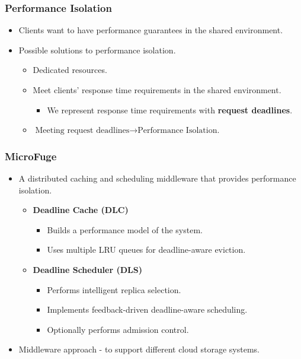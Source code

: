 \documentclass{beamer}
\newcommand{\myv}{\vspace{3 mm}}
\begin{document}
\begin{frame}
  \frametitle{Performance Isolation}
  \begin{itemize}
  \item Clients want to have performance guarantees in the shared
    environment. \myv
  \item Possible solutions to performance isolation.
    \myv
    \begin{itemize}
    \item Dedicated resources.
      \myv
    \item Meet clients' response time requirements in the shared environment.
      \myv
      \begin{itemize}
      \item We represent response time requirements with \textbf{request deadlines}.
      \end{itemize}
      \myv
    \item \(\text{Meeting request deadlines} \rightarrow \text{Performance Isolation.}\)
    \end{itemize}
  \end{itemize}
\end{frame}

\begin{frame}
  \frametitle{MicroFuge}
  \begin{itemize}
  \item A distributed caching and scheduling middleware that provides
    performance isolation.
    \myv
    \begin{itemize}
    \item \textbf{Deadline Cache (DLC)}
      \myv
      \begin{itemize}
      \item Builds a performance model of the system.
        \myv
      \item Uses multiple LRU queues for deadline-aware eviction.
        \myv
      \end{itemize}
    \item \textbf{Deadline Scheduler (DLS)}
      \begin{itemize}
        \myv
      \item Performs intelligent replica selection.
        \myv
      \item Implements feedback-driven deadline-aware scheduling.
        \myv
      \item Optionally performs admission control.
      \end{itemize}
    \end{itemize}
    \myv
  \item Middleware approach - to support different cloud storage systems.
  \end{itemize}
\end{frame}
\end{document}
